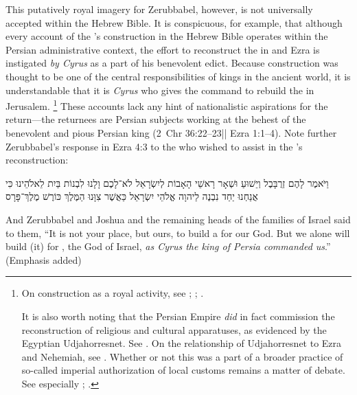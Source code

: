 This putatively royal imagery for Zerubbabel, however, is not universally accepted within the Hebrew Bible. It is conspicuous, for example, that although every account of the \secondtemple's construction in the Hebrew Bible operates within the Persian administrative context, the effort to reconstruct the \temple in \chronicles and Ezra is instigated \emph{by Cyrus} as a part of his benevolent edict. Because \temple construction was thought to be one of the central responsibilities of kings in the ancient world, it is understandable that it is \emph{Cyrus} who gives the command to rebuild the \temple in Jerusalem.%
    \footnote{On \temple construction as a royal activity, see
        \cite{kapelrud_orientalia1963};
        \cite{petersen_cbq1974};
        \cite{laato_zaw1994}.

        It is also worth noting that the Persian Empire \emph{did} in fact commission the reconstruction of religious and cultural apparatuses, as evidenced by the Egyptian Udjahorresnet. See 
            \cite{lloyd_jea1982}. On the relationship of Udjahorresnet to Ezra and Nehemiah, see 
            \cite{blenkinsopp_jbl1987}.
        Whether or not this was a part of a broader practice of so-called imperial authorization of local customs remains a matter of debate. See especially
            \cite{frei_frei1984};
            \cite{frei_watts2001}.}
These accounts lack any hint of nationalistic aspirations for the return---the returnees are Persian subjects working at the behest of the benevolent and pious Persian king (2~Chr 36:22--23|| Ezra 1:1--4). Note further Zerubbabel's response in Ezra 4:3 to the  who wished to assist in the \temple's reconstruction:
\begin{hebrewtext}
    וַיֹּאמֶר לָהֶם זְרֻבָּבֶל וְיֵשׁוּעַ וּשְׁאָר רָאשֵׁי הָאָבוֹת לְיִשְׂרָאֵל לֹא־לָכֶם וָלָנוּ לִבְנוֹת בַּיִת לֵאלֹהֵינוּ כִּי אֲנַחְנוּ יַחַד נִבְנֶה לַיהוָה אֱלֹהֵי יִשְׂרָאֵל כַּאֲשֶׁר צִוָּנוּ הַמֶּלֶךְ כּוֹרֶשׁ מֶלֶךְ־פָּרָס
\end{hebrewtext}
\begin{translation}
    And Zerubbabel and Joshua and the remaining heads of the families of Israel said to them, ``It is not your place, but ours, to build a \temple for our God. But we alone will build (it) for \yahweh, the God of Israel, \emph{as Cyrus the king of Persia commanded us}.'' (Emphasis added)
\end{translation}
\noindent
